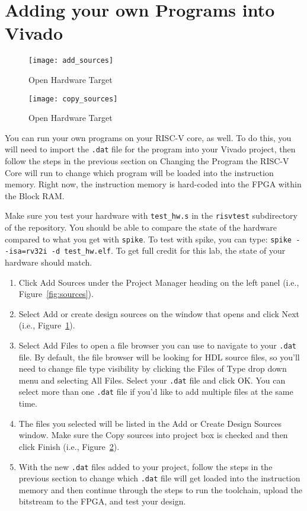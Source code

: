 \documentclass{article}
\begin{document}
\section{Adding your own Programs into Vivado}

\begin{figure}[h!]
  \centering
  \texttt{[image: add\_sources]}
  \caption{Open Hardware Target}
  \label{fig:addsources}
\end{figure}
\begin{figure}[h!]
  \centering
  \texttt{[image: copy\_sources]}
  \caption{Open Hardware Target}
  \label{fig:copysources}
\end{figure}
You can run your own programs on your RISC-V core, as well.  To do this, you will
need to import the \verb|.dat| file for the program into your Vivado project,
then follow the steps in the previous section on Changing the Program the RISC-V
Core will run to change which program will be loaded into the instruction
memory.  Right now, the instruction memory is hard-coded into the FPGA
within the Block RAM.

Make sure you test your hardware with \verb!test_hw.s! in the
\verb!risvtest! subdirectory of the repository.  You should be able to
compare the state of the hardware compared to what you get with
\verb!spike!.  To test with spike, you can type:
\verb!spike --isa=rv32i -d test_hw.elf!.  To get full credit for this
lab, the state of your hardware should match.

\begin{enumerate}
\item Click Add Sources under the Project Manager heading on the left panel
(i.e., Figure~\ref{fig:sources}).

\item Select Add or create design sources on the window that opens and click
Next (i.e., Figure~\ref{fig:addsources}).

\item Select Add Files to open a file browser you can use to navigate to your
\verb|.dat| file.  By default, the file browser will be looking for HDL source
files, so you'll need to change file type visibility by clicking the Files of
Type drop down menu and selecting All Files.  Select your \verb|.dat| file and
click OK.  You can select more than one \verb|.dat| file if you'd like to add
multiple files at the same time.

\item The files you selected will be listed in the Add or Create Design Sources
window.  Make sure the Copy sources into project box is checked and then click
Finish (i.e., Figure~\ref{fig:copysources}).

\item  With the new \verb|.dat| files added to your project, follow the steps in
the previous section to change which \verb|.dat| file will get loaded into the
instruction memory and then continue through the steps to run the toolchain,
upload the bitstream to the FPGA, and test your design.
\end{enumerate}



\end{document}
